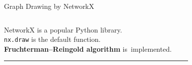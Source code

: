 \documentclass[dvipdfmx,13pt,aspectratio=169]{beamer}
\newcommand{\red}[1]{\textcolor{red}{#1}}
\newif\ifShowHidden
\begin{document}
\begin{frame}{Graph Drawing by NetworkX}
  \begin{columns}
    \begin{column}{0.62\columnwidth}
      \large{%
        NetworkX  is a popular Python library.\\
        \texttt{nx.draw} is the default function.\\
        \large{\textbf{Fruchterman--Reingold algorithm}} is~implemented.
      }
      \begin{center}
        \rule{0.8\columnwidth}{0.4pt}
      \end{center}
      \Large{
        \\
        \\
        \uncover<3->{$\abs{V}=500$: \red{11.5} sec / \red{WHAT IS THIS???}}
      }
    \end{column}
    \begin{column}{0.38\columnwidth}
      \begin{figure}[htbp]
        \centering

\end{figure}
\end{column}
\end{columns}
\end{frame}
\end{document}
